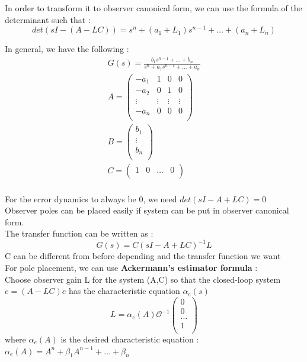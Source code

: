 \documentclass[../main.tex]{subfiles}
\begin{document}
In order to transform it to observer canonical form, we can use the formula of the determinant such that : \begin{equation}
    det(sI-(A-LC)) = s^n + (a_1+L_1)s^{n-1} + \dots + (a_n+L_n)
\end{equation}

In general, we have the following : \begin{equation}
    \begin{gathered}
    G(s) = \frac{b_1 s^{n-1} + \dots + b_n}{s^n + a_1 s^{n-1} + \dots + a_n}\\
        A = \begin{pmatrix}
            -a_1 & 1 & 0&0\\
            -a_2 & 0 & 1&0\\
            \vdots & \vdots&\vdots & \vdots\\
            -a_n & 0&0 & 0\\
        \end{pmatrix}\\
        B = \begin{pmatrix}
            b_1\\ \vdots \\ b_n\\
        \end{pmatrix}\\
        C = \begin{pmatrix}
            1 & 0 & \dots & 0\\
        \end{pmatrix}\\
    \end{gathered}
\end{equation}

For the error dynamics to always be 0, we need $det(sI-A+LC) = 0$\\
Observer poles can be placed easily if system can be put in observer canonical form.\\
The transfer function can be written as : \begin{equation}
    G(s) = C (sI-A+LC)^{-1}L
\end{equation}
\warning C can be different from before depending and the transfer function we want\\

For pole placement, we can use \textbf{Ackermann's estimator formula} : \\
Choose observer gain L for the system (A,C) so that the closed-loop system $\dot{e} = (A-LC)e$ has the characteristic equation $\alpha_e(s)$ \begin{equation}
    L = \alpha_e(A) \mathcal{O}^{-1} \begin{pmatrix}
        0\\0\\ \dots \\ 1\\
    \end{pmatrix}
\end{equation}
where $\alpha_e(A)$ is the desired characteristic equation : $\alpha_e(A) = A^n + \beta_1 A^{n-1} + \dots + \beta_n$\\
\end{document}
